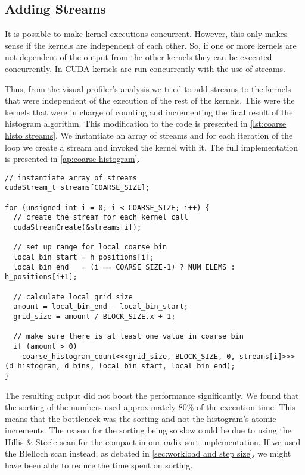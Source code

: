 \subsection{Adding Streams}

It is possible to make kernel executions concurrent.
However, this only makes sense if the kernels are independent of each other.
So, if one or more kernels are not dependent of the output from the other kernels they can be executed concurrently.
In CUDA kernels are run concurrently with the use of streams.

Thus, from the visual profiler's analysis we tried to add streams to the kernels that were independent of the execution of the rest of the kernels.
This were the kernels that were in charge of counting and incrementing the final result of the histogram algorithm.
This modification to the code is presented in \cref{lst:coarse histo streams}.
We instantiate an array of streams and for each iteration of the loop we create a stream and invoked the kernel with it.
The full implementation is presented in \cref{ap:coarse histogram}.

\begin{lstlisting}[caption={Using streams to invoke kernels concurrently}, label={lst:coarse histo streams}]
// instantiate array of streams
cudaStream_t streams[COARSE_SIZE];

for (unsigned int i = 0; i < COARSE_SIZE; i++) {
  // create the stream for each kernel call
  cudaStreamCreate(&streams[i]);

  // set up range for local coarse bin
  local_bin_start = h_positions[i];
  local_bin_end   = (i == COARSE_SIZE-1) ? NUM_ELEMS : h_positions[i+1];

  // calculate local grid size
  amount = local_bin_end - local_bin_start;
  grid_size = amount / BLOCK_SIZE.x + 1;

  // make sure there is at least one value in coarse bin
  if (amount > 0)
    coarse_histogram_count<<<grid_size, BLOCK_SIZE, 0, streams[i]>>>(d_histogram, d_bins, local_bin_start, local_bin_end);
}
\end{lstlisting}

The resulting output did not boost the performance significantly.
We found that the sorting of the numbers used approximately $80\%$ of the execution time.
This means that the bottleneck was the sorting and not the histogram's atomic increments.
The reason for the sorting being so slow could be due to using the Hillis \& Steele scan for the compact in our radix sort implementation.
If we used the Blelloch scan instead, as debated in \cref{sec:workload and step size}, we might have been able to reduce the time spent on sorting.
